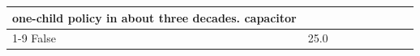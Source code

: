 \begin{table}[H]
\begin{tabular}{lllrlllll}
one-child policy in about three decades. capacitor \\
\cline{1-9}
False & 25.0%
\end{tabular}
\end{table}
